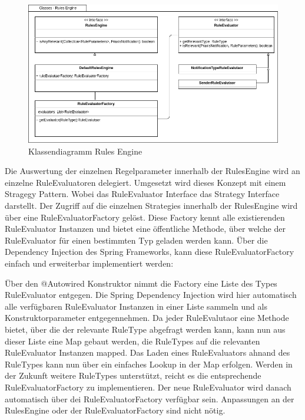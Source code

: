 \begin{figure}[h]
    \centering
    \begin{minipage}[b]{0.9\textwidth}
        \includegraphics[width=\textwidth]{graphics/Class_Configuration_RulesEngine}
        \caption{Klassendiagramm Rules Engine}
    \end{minipage}
\end{figure}

Die Auswertung der einzelnen Regelparameter innerhalb der RulesEngine wird an einzelne RuleEvaluatoren delegiert.
Umgesetzt wird dieses Konzept mit einem Stragegy Pattern.
Wobei das RuleEvaluator Interface das Strategy Interface darstellt.
Der Zugriff auf die einzelnen Strategies innerhalb der RulesEngine wird über eine RuleEvaluatorFactory gelöst.
Diese Factory kennt alle existierenden RuleEvaluator Instanzen und bietet eine öffentliche Methode, über welche der RuleEvaluator für einen bestimmten Typ geladen werden kann.
Über die Dependency Injection des Spring Frameworks, kann diese RuleEvaluatorFactory einfach und erweiterbar implementiert werden:



Über den @Autowired Konstruktor nimmt die Factory eine Liste des Types RuleEvaluator entgegen.
Die Spring Dependency Injection wird hier automatisch alle verfügbaren RuleEvaluator Instanzen in einer Liste sammeln und als Konstruktorparameter entgegennehmen.
Da jeder RuleEvalutaor eine Methode bietet, über die der relevante RuleType abgefragt werden kann, kann nun aus dieser Liste eine Map gebaut werden, die RuleTypes auf die relevanten RuleEvaluator Instanzen mapped.
Das Laden eines RuleEvaluators ahnand des RuleTypes kann nun über ein einfaches Lookup in der Map erfolgen.
Werden in der Zukunft weitere RuleTypes unterstützt, reicht es die entsprechende RuleEvaluatorFactory zu implementieren.
Der neue RuleEvaluator wird danach automatisch über dei RuleEvaluatorFactory verfügbar sein.
Anpassungen an der RulesEngine oder der RuleEvaluatorFactory sind nicht nötig.

